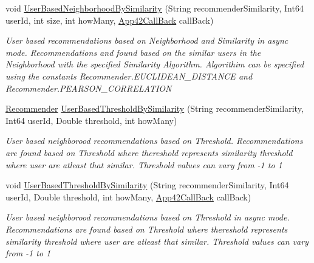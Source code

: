 \begin{DoxyCompactItemize}
void \hyperlink{classcom_1_1shephertz_1_1app42_1_1paas_1_1sdk_1_1csharp_1_1recommend_1_1_recommender_service_a00fc349ff37faad3ffa1cf6ccfe26110}{User\+Based\+Neighborhood\+By\+Similarity} (String recommender\+Similarity, Int64 user\+Id, int size, int how\+Many, \hyperlink{interfacecom_1_1shephertz_1_1app42_1_1paas_1_1sdk_1_1csharp_1_1_app42_call_back}{App42\+Call\+Back} call\+Back)
\begin{DoxyCompactList}\small\item\em User based recommendations based on Neighborhood and Similarity in async mode. Recommendations and found based on the similar users in the Neighborhood with the specified Similarity Algorithm. Algorithim can be specified using the constants Recommender.\+E\+U\+C\+L\+I\+D\+E\+A\+N\+\_\+\+D\+I\+S\+T\+A\+N\+C\+E and Recommender.\+P\+E\+A\+R\+S\+O\+N\+\_\+\+C\+O\+R\+R\+E\+L\+A\+T\+I\+O\+N \end{DoxyCompactList}\item 
\hyperlink{classcom_1_1shephertz_1_1app42_1_1paas_1_1sdk_1_1csharp_1_1recommend_1_1_recommender}{Recommender} \hyperlink{classcom_1_1shephertz_1_1app42_1_1paas_1_1sdk_1_1csharp_1_1recommend_1_1_recommender_service_ab8e4b4f3695039c97c791cc147863bde}{User\+Based\+Threshold\+By\+Similarity} (String recommender\+Similarity, Int64 user\+Id, Double threshold, int how\+Many)
\begin{DoxyCompactList}\small\item\em User based neighborood recommendations based on Threshold. Recommendations are found based on Threshold where thereshold represents similarity threshold where user are atleast that similar. Threshold values can vary from -\/1 to 1 \end{DoxyCompactList}\item 
void \hyperlink{classcom_1_1shephertz_1_1app42_1_1paas_1_1sdk_1_1csharp_1_1recommend_1_1_recommender_service_a7edf7b15b9b93118cf7e4ef6ad9492d2}{User\+Based\+Threshold\+By\+Similarity} (String recommender\+Similarity, Int64 user\+Id, Double threshold, int how\+Many, \hyperlink{interfacecom_1_1shephertz_1_1app42_1_1paas_1_1sdk_1_1csharp_1_1_app42_call_back}{App42\+Call\+Back} call\+Back)
\begin{DoxyCompactList}\small\item\em User based neighborood recommendations based on Threshold in async mode. Recommendations are found based on Threshold where thereshold represents similarity threshold where user are atleast that similar. Threshold values can vary from -\/1 to 1 \end{DoxyCompactList}\item 

\end{DoxyCompactItemize}
